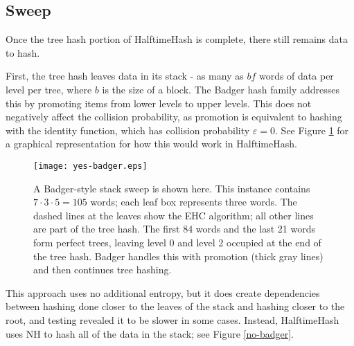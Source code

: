 \documentclass[runningheads]{llncs}
\begin{document}




\subsection{Sweep}


Once the tree hash portion of HalftimeHash is complete, there still remains data to hash.

First, the tree hash leaves data in its stack - as many as $bf$ words of data per level per tree, where $b$ is the size of a block.
The Badger hash family addresses this by promoting items from lower levels to upper levels.
This does not negatively affect the collision probability, as promotion is equivalent to hashing with the identity function, which has collision probability $\varepsilon = 0$.
See Figure \ref{yes-badger} for a graphical representation for how this would work in HalftimeHash.

\begin{figure}
\texttt{[image: yes-badger.eps]}
\caption{\label{yes-badger}
  A Badger-style stack sweep is shown here.
  This instance contains $7 \cdot 3 \cdot 5 = 105$ words; each leaf box represents three words.
  The dashed lines at the leaves show the EHC algorithm; all other lines are part of the tree hash.
  The first 84 words and the last 21 words form perfect trees, leaving level 0 and level 2 occupied at the end of the tree hash.
  Badger handles this with promotion (thick gray lines) and then continues tree hashing. \cite{badger}
}
\end{figure}

This approach uses no additional entropy, but it does create dependencies between hashing done closer to the leaves of the stack and hashing closer to the root, and testing revealed it to be slower in some cases.
Instead, HalftimeHash uses NH to hash all of the data in the stack; see Figure \ref{no-badger}.
\end{document}
